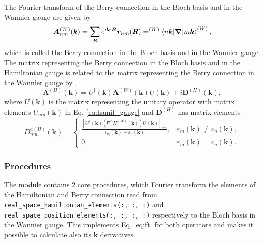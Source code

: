 \documentclass[10pt,a4paper]{article}
\begin{document}
The Fourier transform of the Berry connection in the Bloch basis and in the Wannier gauge are given by \cite{wangInitioCalculationAnomalous2006}
\begin{equation}
\bm{A}_{nm}^{(W)}(\bm{k}) = \sum_{\bm{R}} e^{i\bm{k}\cdot\bm{R}} \bm{r}_{nm}(\bm{R}) = ^{(W)}\braket{n\bm{k}|\bm{\nabla}|m\bm{k}}^{(W)},
\end{equation}
which is called the Berry connection in the Bloch basis and in the Wannier gauge. The matrix representing the Berry connection in the Bloch basis and in the Hamiltonian gauge is related to the matrix representing the Berry connection in the Wannier gauge by \cite{wangInitioCalculationAnomalous2006},
\begin{equation}
\bm{A}^{(H)}(\bm{k}) = U^{\dagger}(\bm{k})\bm{A}^{(W)}(\bm{k})U(\bm{k}) + i \bm{D}^{(H)}(\bm{k}),
\end{equation}
where $U(\bm{k})$ is the matrix representing the unitary operator with matrix elements $U_{mn}(\bm{k})$ in Eq. \eqref{eq:hamil_gauge} and $\bm{D}^{(H)}$ has matrix elements
\begin{equation}\label{eq:d}
D^{a(H)}_{nm}(\bm{k}) = \begin{cases}
\frac{\left[U^{\dagger}(\bm{k})\left(\nabla^a H^{(W)}(\bm{k})\right)U(\bm{k})\right]_{nm}}{\varepsilon_m(\bm{k})-\varepsilon_n(\bm{k})},& \varepsilon_m(\bm{k})\neq\varepsilon_n(\bm{k}),\\
 0,& \varepsilon_m(\bm{k})=\varepsilon_n(\bm{k}).
\end{cases}
\end{equation}
\subsubsection{Procedures}
The module contains 2 core procedures, which Fourier transform the elements of the Hamiltonian and Berry connection read from \verb|real_space_hamiltonian_elements(:, :, :)| and \\ \verb|real_space_position_elements(:, :, :, :)| respectively to the Bloch basis in the Wannier gauge. This implements Eq. \eqref{eq:ft} for both operators and makes it possible to calculate also its $\bm{k}$ derivatives.
\end{document}

